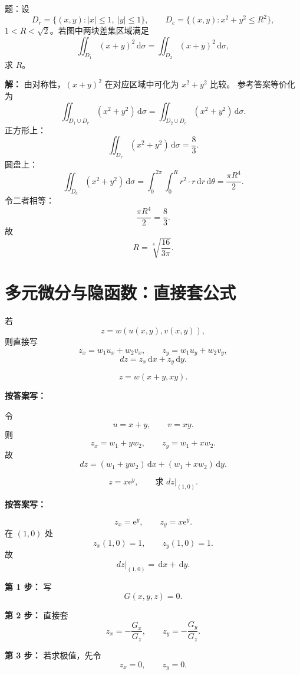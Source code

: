 \documentclass[11pt,a4paper,UTF8]{ctexart}
\newcommand{\dd}{\,\mathrm d}
\newcommand{\ee}{\mathrm e}
\begin{document}
\begin{answerbox}[2023--2024 大题：正方形与圆盘区域]
题：设
\[
D_r=\{(x,y):|x|\le1,\ |y|\le1\},\qquad
D_c=\{(x,y):x^2+y^2\le R^2\},
\]
\(1<R<\sqrt2\)。若图中两块差集区域满足
\[
\iint_{D_1}(x+y)^2\dd\sigma=\iint_{D_2}(x+y)^2\dd\sigma,
\]
求 \(R\)。

\textbf{解：}
由对称性，\((x+y)^2\) 在对应区域中可化为 \(x^2+y^2\) 比较。
参考答案等价化为
\[
\iint_{D_1\cup D_r}(x^2+y^2)\dd\sigma
=
\iint_{D_2\cup D_c}(x^2+y^2)\dd\sigma.
\]
正方形上：
\[
\iint_{D_r}(x^2+y^2)\dd\sigma=\frac83.
\]
圆盘上：
\[
\iint_{D_c}(x^2+y^2)\dd\sigma
=\int_0^{2\pi}\int_0^R r^2\cdot r\dd r\dd\theta
=\frac{\pi R^4}{2}.
\]
令二者相等：
\[
\frac{\pi R^4}{2}=\frac83.
\]
故
\[
\boxed{R=\sqrt[4]{\frac{16}{3\pi}}}.
\]
\end{answerbox}
\section{多元微分与隐函数：直接套公式}

\begin{templatebox}[链式法则模板]
若
\[
z=w(u(x,y),v(x,y)),
\]
则直接写
\[
z_x=w_1u_x+w_2v_x,\qquad z_y=w_1u_y+w_2v_y,
\]
\[
dz=z_x\dd x+z_y\dd y.
\]
\end{templatebox}

\begin{answerbox}[例 1：全微分，2024--2025]
\[
z=w(x+y,xy).
\]

\textbf{按答案写：}

令
\[
u=x+y,\qquad v=xy.
\]
则
\[
z_x=w_1+yw_2,\qquad z_y=w_1+xw_2.
\]
故
\[
\boxed{dz=(w_1+yw_2)\dd x+(w_1+xw_2)\dd y.}
\]
\end{answerbox}

\begin{answerbox}[例 2：全微分，2020--2021]
\[
z=x\ee^y,\qquad \text{求 }dz\big|_{(1,0)}.
\]

\textbf{按答案写：}

\[
z_x=\ee^y,\qquad z_y=x\ee^y.
\]
在 \((1,0)\) 处
\[
z_x(1,0)=1,\qquad z_y(1,0)=1.
\]
故
\[
\boxed{dz\big|_{(1,0)}=\dd x+\dd y.}
\]
\end{answerbox}

\begin{templatebox}[隐函数标准模板]
\textbf{第 1 步：} 写
\[
G(x,y,z)=0.
\]

\textbf{第 2 步：} 直接套
\[
\boxed{z_x=-\frac{G_x}{G_z}},\qquad
\boxed{z_y=-\frac{G_y}{G_z}}.
\]

\textbf{第 3 步：} 若求极值，先令
\[
z_x=0,\qquad z_y=0.
\]
\end{templatebox}
\end{document}
